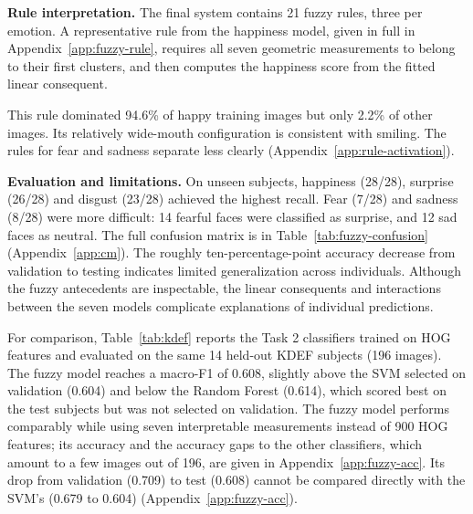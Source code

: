 \textbf{Rule interpretation.}
The final system contains 21 fuzzy rules, three per emotion.
A representative rule from the happiness model, given in full in Appendix~\ref{app:fuzzy-rule}, requires all seven geometric measurements to belong to their first clusters, and then computes the happiness score from the fitted linear consequent.

This rule dominated 94.6\% of happy training images but only
2.2\% of other images. Its relatively wide-mouth configuration
is consistent with smiling. The rules for fear and sadness separate less clearly (Appendix~\ref{app:rule-activation}).

\textbf{Evaluation and limitations.}
On unseen subjects, happiness (28/28), surprise (26/28) and
disgust (23/28) achieved the highest recall. Fear (7/28) and
sadness (8/28) were more difficult: 14 fearful faces were
classified as surprise, and 12 sad faces as neutral. The full confusion matrix is in Table~\ref{tab:fuzzy-confusion} (Appendix~\ref{app:cm}).
The roughly ten-percentage-point accuracy decrease from
validation to testing indicates limited generalization across
individuals. Although the fuzzy antecedents are inspectable,
the linear consequents and interactions between the seven
models complicate explanations of individual predictions.

For comparison, Table~\ref{tab:kdef} reports the Task 2 classifiers
trained on HOG features and evaluated on the same 14 held-out KDEF
subjects (196 images). The fuzzy model reaches a macro-F1 of 0.608,
slightly above the SVM selected on validation (0.604) and below the
Random Forest (0.614), which scored best on the test subjects but was
not selected on validation. The fuzzy model performs comparably while using seven interpretable measurements instead of 900 HOG features; its accuracy and the accuracy gaps to the other classifiers, which amount to a few images out of 196, are given in Appendix~\ref{app:fuzzy-acc}. Its drop from validation
(0.709) to test (0.608) cannot be compared directly with the SVM's (0.679 to 0.604) (Appendix~\ref{app:fuzzy-acc}).

